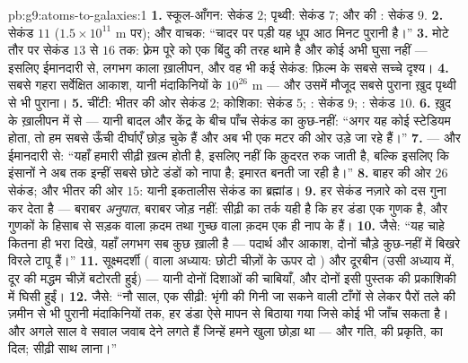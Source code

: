 \begin{solution}{pb:g9:atoms-to-galaxies:1}
\textbf{1.} स्कूल-आँगन: सेकंड $2$; पृथ्वी: सेकंड $7$; और  की
: सेकंड $9$.
\textbf{2.} सेकंड $11$ ($1.5 \times 10^{11}$ \unit{m} पर); और वाचक:
``चादर पर पड़ी यह धूप आठ मिनट पुरानी है।''
\textbf{3.} मोटे तौर पर सेकंड $13$ से $16$ तक: फ़्रेम पूरे  को
एक बिंदु की तरह थामे है और कोई  अभी घुसा नहीं --- इसलिए ईमानदारी
से, लगभग काला ख़ालीपन, और वह भी कई सेकंड: फ़िल्म के सबसे सच्चे दृश्य।
\textbf{4.} सबसे गहरा सर्वेक्षित आकाश, यानी मंदाकिनियों के $10^{26}$
\unit{m} --- और उसमें मौजूद सबसे पुराना  ख़ुद पृथ्वी से भी पुराना।
\textbf{5.} चींटी: भीतर की ओर सेकंड $2$; कोशिका: सेकंड $5$; :
सेकंड $9$; : सेकंड $10$.
\textbf{6.} ख़ुद  के ख़ालीपन में से --- यानी बादल और केंद्र के
बीच पाँच सेकंड का कुछ-नहीं: ``अगर यह  कोई स्टेडियम होता, तो हम
सबसे ऊँची दीर्घाएँ छोड़ चुके हैं और अब भी एक मटर की ओर उड़े जा रहे
हैं।''
\textbf{7.}  --- और ईमानदारी से: ``यहाँ हमारी सीढ़ी ख़त्म होती
है, इसलिए नहीं कि क़ुदरत रुक जाती है, बल्कि इसलिए कि इंसानों ने अब तक
इन्हीं सबसे छोटे डंडों को नापा है; इमारत बनती जा रही है।''
\textbf{8.} बाहर की ओर $26$ सेकंड; और भीतर की ओर $15$: यानी इकतालीस
सेकंड का ब्रह्मांड।
\textbf{9.} हर सेकंड नज़ारे को दस गुना कर देता है --- बराबर
\emph{अनुपात}, बराबर जोड़ नहीं: सीढ़ी का तर्क यही है कि हर डंडा एक
गुणक है, और गुणकों के हिसाब से सड़क वाला क़दम तथा गुच्छ वाला क़दम एक
ही नाप के हैं।
\textbf{10.} जैसे: ``यह चाहे कितना ही भरा दिखे, यहाँ लगभग सब कुछ
ख़ाली है --- पदार्थ और आकाश, दोनों चौड़े कुछ-नहीं में बिखरे विरले
टापू हैं।''
\textbf{11.} सूक्ष्मदर्शी ( वाला अध्याय: छोटी चीज़ों के ऊपर दो
) और दूरबीन (उसी अध्याय में, दूर की मद्धम चीज़ें बटोरती
हुई) --- यानी दोनों दिशाओं की चाबियाँ, और दोनों इसी पुस्तक की
प्रकाशिकी में घिसी हुईं।
\textbf{12.} जैसे: ``नौ साल, एक सीढ़ी: भृंगी की गिनी जा सकने वाली
टाँगों से लेकर पैरों तले की ज़मीन से भी पुरानी मंदाकिनियों तक, हर डंडा
ऐसे मापन से बिठाया गया जिसे कोई भी जाँच सकता है। और अगले साल वे सवाल
जवाब देने लगते हैं जिन्हें हमने खुला छोड़ा था ---  और गति,  की
प्रकृति,  का दिल; सीढ़ी साथ लाना।''
\end{solution}
